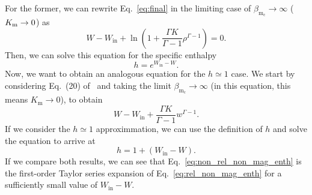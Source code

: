 \documentclass[twocolumn,aps,showpacs,showkeys,prd,superscriptaddress,byrevtex, amsmath]{revtex4-1}
\begin{document}
For the former, we can rewrite Eq.~\eqref{eq:final} in the limiting case of $\beta_{\mathrm{m_c}} \rightarrow \infty$ ($K_{\rm m} \rightarrow 0$) as
\begin{equation}
W - W_{\mathrm{in}} + \ln \left(1 + \frac{\Gamma K}{\Gamma -1}\rho^{\Gamma -1}\right) = 0.
\end{equation}
Then, we can solve this equation for the specific enthalpy
\begin{equation}\label{eq:rel_non_mag_enth}
h = e^{W_{\mathrm{in}} - W}.
\end{equation}
Now, we want to obtain an analogous equation for the $h \simeq 1$ case. We start by considering Eq.~(20) of~\cite{Gimeno-Soler:2017} and taking the limit $\beta_{\mathrm{m_c}} \rightarrow \infty$ (in this equation, this means $K_{\mathrm{m}} \rightarrow 0$), to obtain
\begin{equation}
W - W_{\mathrm{in}} + \frac{\Gamma K}{\Gamma -1}w^{\Gamma -1}.
\end{equation}
If we consider the $h \simeq 1$ approximmation, we can use the definition of $h$ and solve the equation to arrive at
\begin{equation}\label{eq:non_rel_non_mag_enth}
h = 1 + (W_{\mathrm{in}} - W).
\end{equation}
If we compare both results, we can see that Eq.~\eqref{eq:non_rel_non_mag_enth} is the first-order Taylor series expansion of Eq.~\eqref{eq:rel_non_mag_enth} for a sufficiently small value of $W_{\mathrm{in}} - W$.
\end{document}
